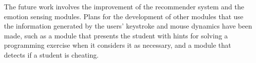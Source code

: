 \documentclass{acm_proc_article-sp}
\begin{document}
The future work involves the improvement of the recommender system and
the emotion sensing modules. Plans for the development of other
modules that use the information generated by the users' keystroke and
mouse dynamics have been made, such as a module that presents the
student with hints for solving a programming exercise when it
considers it as necessary, and a module that detects if a student is
cheating.




\balancecolumns
\end{document}
